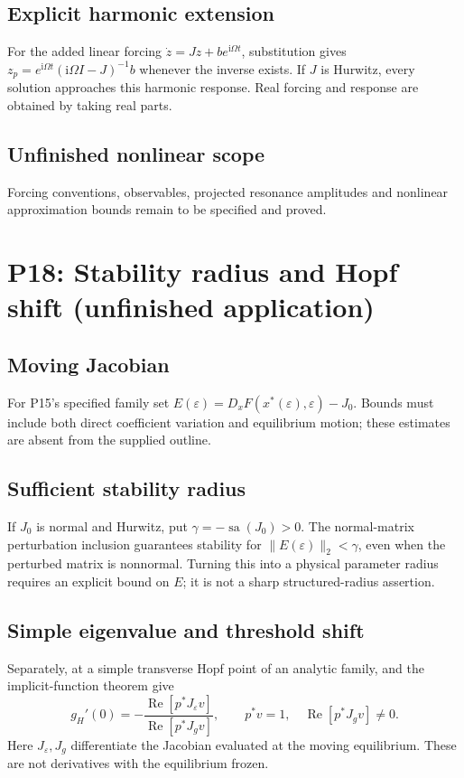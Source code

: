 \documentclass[11pt]{article}
\newcommand{\ii}{\mathrm{i}}
\newcommand{\eps}{\varepsilon}
\DeclareMathOperator{\sa}{sa}
\DeclareMathOperator{\Ree}{Re}
\theoremstyle{definition}
\theoremstyle{remark}
\begin{document}
\subsection{Explicit harmonic extension}\label{slot:P17-3}
For the added linear forcing $\dot z=Jz+be^{\ii\Omega t}$, substitution
gives $z_p=e^{\ii\Omega t}(\ii\Omega I-J)^{-1}b$ whenever the inverse
exists. If $J$ is Hurwitz, every solution approaches this harmonic response.
Real forcing and response are obtained by taking real parts.
\subsection{Unfinished nonlinear scope}\label{slot:P17-4}
Forcing conventions, observables, projected resonance amplitudes and
nonlinear approximation bounds remain to be specified and proved.


\section{P18: Stability radius and Hopf shift (unfinished application)}
\label{sec:P18}
\subsection{Moving Jacobian}\label{slot:P18-1}
For P15's specified family set
$E(\eps)=D_xF(x^*(\eps),\eps)-J_0$. Bounds must include both direct
coefficient variation and equilibrium motion; these estimates are absent
from the supplied outline.
\subsection{Sufficient stability radius}\label{slot:P18-2}
If $J_0$ is normal and Hurwitz, put $\gamma=-\sa(J_0)>0$.
The normal-matrix perturbation inclusion
\cite[\S1 and Theorem~$4_\eps$]{EmbreeTrefethen2001} guarantees
stability for $\|E(\eps)\|_2<\gamma$, even when the perturbed matrix
is nonnormal. Turning this into a physical parameter radius requires
an explicit bound on $E$; it is not a sharp structured-radius assertion.
\subsection{Simple eigenvalue and threshold shift}\label{slot:P18-3}
Separately, at a simple transverse Hopf point of an analytic family,
\cite[Theorem~1]{GreenbaumLiOverton2020} and the implicit-function
theorem give
\[
 g_H'(0)=-\frac{\Ree[p^*J_\eps v]}{\Ree[p^*J_gv]},\qquad
 p^*v=1,\quad\Ree[p^*J_gv]\ne0.
\]
Here $J_\eps,J_g$ differentiate the Jacobian evaluated at the moving
equilibrium. These are not derivatives with the equilibrium frozen.
\end{document}
